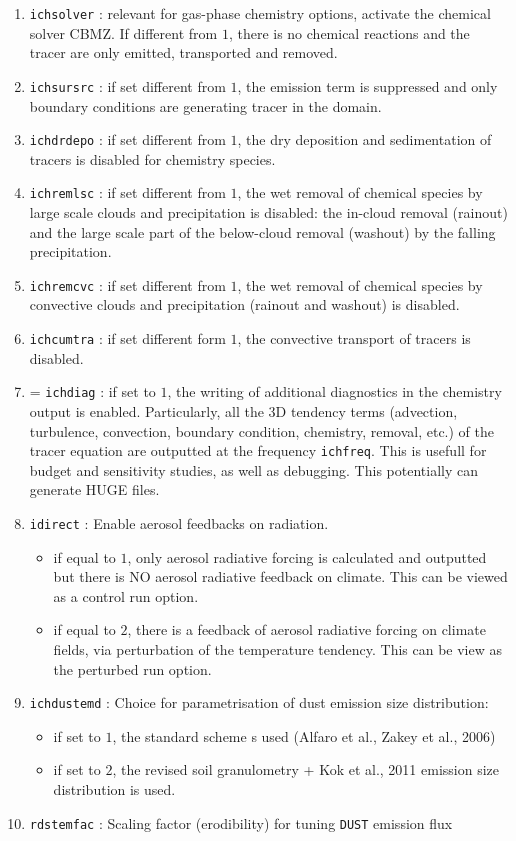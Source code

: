 \begin{enumerate}
  \item \verb=ichsolver= : relevant for gas-phase chemistry options, activate
    the chemical solver CBMZ. If different from $1$, there is no chemical
    reactions and the tracer are only emitted, transported and removed.
  \item \verb=ichsursrc= : if set different from $1$, the emission term is
    suppressed and only boundary conditions are generating tracer in the domain.
  \item \verb=ichdrdepo= : if set different from $1$, the dry deposition and
    sedimentation of tracers is disabled for chemistry species.
  \item \verb=ichremlsc= : if set different from $1$, the wet removal of
    chemical species by large scale clouds and precipitation is disabled:
    the in-cloud removal (rainout) and the large scale part of the
    below-cloud removal (washout) by the falling precipitation.
  \item \verb=ichremcvc= : if set different from $1$, the wet removal of
    chemical species by convective clouds and precipitation (rainout and
    washout) is disabled.
  \item \verb=ichcumtra= : if set different form $1$, the convective transport
    of tracers is disabled.
  \item= \verb=ichdiag= : if set to $1$, the writing of additional diagnostics
    in the chemistry output is enabled. Particularly, all the 3D tendency terms
    (advection, turbulence, convection, boundary condition, chemistry, removal,
    etc.) of the tracer equation are outputted at the frequency \verb=ichfreq=.
    This is usefull for budget and sensitivity studies, as well as debugging.
    This potentially can generate HUGE files.
  \item \verb=idirect= : Enable aerosol feedbacks on radiation.
    \begin{itemize}
      \item if equal to $1$, only aerosol radiative forcing is calculated and
        outputted but there is NO aerosol radiative feedback on climate.
        This can be viewed as a control run option.
      \item if equal to $2$, there is a feedback of aerosol radiative forcing
        on climate fields, via perturbation of the temperature tendency.
        This can be view as the perturbed run option.
    \end{itemize}
  \item \verb=ichdustemd= : Choice for parametrisation of dust emission size
    distribution:
    \begin{itemize}
      \item if set to $1$, the standard scheme s used (Alfaro et al.,
        Zakey et al., 2006)
      \item if set to $2$, the revised soil granulometry + Kok et al., 2011
        emission size distribution is used.
    \end{itemize}
  \item \verb=rdstemfac= : Scaling factor (erodibility) for tuning  \verb=DUST= emission flux
\end{enumerate}

